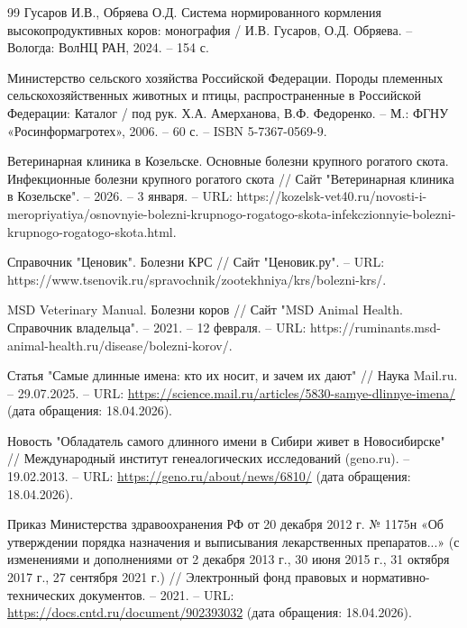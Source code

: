 \begin{thebibliography}{99}
Гусаров И.В., Обряева О.Д.
Система нормированного кормления высокопродуктивных коров: монография /
И.В. Гусаров, О.Д. Обряева. – Вологда: ВолНЦ РАН, 2024. – 154 с.

Министерство сельского хозяйства Российской Федерации.
Породы племенных сельскохозяйственных животных и птицы, распространенные в Российской Федерации: Каталог / 
под рук. Х.А. Амерханова, В.Ф. Федоренко. – 
М.: ФГНУ «Росинформагротех», 2006. – 60 с. – 
ISBN 5-7367-0569-9.

Ветеринарная клиника в Козельске.
Основные болезни крупного рогатого скота. Инфекционные болезни крупного рогатого скота //
Сайт "Ветеринарная клиника в Козельске". – 2026. – 3 января. –
URL: https://kozelsk-vet40.ru/novosti-i-meropriyatiya/osnovnyie-bolezni-krupnogo-rogatogo-skota-infekczionnyie-bolezni-krupnogo-rogatogo-skota.html.

Справочник "Ценовик".
Болезни КРС //
Сайт "Ценовик.ру". –
URL: https://www.tsenovik.ru/spravochnik/zootekhniya/krs/bolezni-krs/.

MSD Veterinary Manual.
Болезни коров //
Сайт "MSD Animal Health. Справочник владельца". – 2021. – 12 февраля. –
URL: https://ruminants.msd-animal-health.ru/disease/bolezni-korov/.

Статья "Самые длинные имена: кто их носит, и зачем их дают" //
Наука Mail.ru. – 29.07.2025. –
URL: \url{https://science.mail.ru/articles/5830-samye-dlinnye-imena/} (дата обращения: 18.04.2026).

Новость "Обладатель самого длинного имени в Сибири живет в Новосибирске" //
Международный институт генеалогических исследований (geno.ru). – 19.02.2013. –
URL: \url{https://geno.ru/about/news/6810/} (дата обращения: 18.04.2026).

Приказ Министерства здравоохранения РФ от 20 декабря 2012 г. № 1175н 
«Об утверждении порядка назначения и выписывания лекарственных препаратов...» 
(с изменениями и дополнениями от 2 декабря 2013 г., 30 июня 2015 г., 31 октября 2017 г., 27 сентября 2021 г.) // 
Электронный фонд правовых и нормативно-технических документов. – 2021. – 
URL: \url{https://docs.cntd.ru/document/902393032} (дата обращения: 18.04.2026).

\end{thebibliography}

